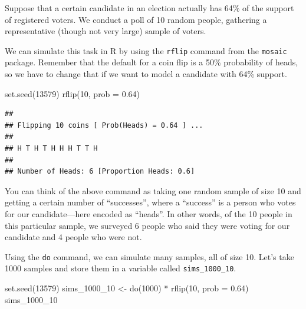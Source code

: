 \documentclass[
]{book}
\newenvironment{Shaded}{\begin{snugshade}}{\end{snugshade}}
\newcommand{\AttributeTok}[1]{\textcolor[rgb]{0.77,0.63,0.00}{#1}}
\newcommand{\DecValTok}[1]{\textcolor[rgb]{0.00,0.00,0.81}{#1}}
\newcommand{\FloatTok}[1]{\textcolor[rgb]{0.00,0.00,0.81}{#1}}
\newcommand{\FunctionTok}[1]{\textcolor[rgb]{0.00,0.00,0.00}{#1}}
\newcommand{\NormalTok}[1]{#1}
\newcommand{\OtherTok}[1]{\textcolor[rgb]{0.56,0.35,0.01}{#1}}
\newcommand{\SpecialCharTok}[1]{\textcolor[rgb]{0.00,0.00,0.00}{#1}}
\begin{document}
Suppose that a certain candidate in an election actually has 64\% of the support of registered voters. We conduct a poll of 10 random people, gathering a representative (though not very large) sample of voters.

We can simulate this task in R by using the \texttt{rflip} command from the \texttt{mosaic} package. Remember that the default for a coin flip is a 50\% probability of heads, so we have to change that if we want to model a candidate with 64\% support.

\begin{Shaded}
\begin{Highlighting}[]
\FunctionTok{set.seed}\NormalTok{(}\DecValTok{13579}\NormalTok{)}
\FunctionTok{rflip}\NormalTok{(}\DecValTok{10}\NormalTok{, }\AttributeTok{prob =} \FloatTok{0.64}\NormalTok{)}
\end{Highlighting}
\end{Shaded}

\begin{verbatim}
## 
## Flipping 10 coins [ Prob(Heads) = 0.64 ] ...
## 
## H T H T H H H T T H
## 
## Number of Heads: 6 [Proportion Heads: 0.6]
\end{verbatim}

You can think of the above command as taking one random sample of size 10 and getting a certain number of ``successes'', where a ``success'' is a person who votes for our candidate---here encoded as ``heads''. In other words, of the 10 people in this particular sample, we surveyed 6 people who said they were voting for our candidate and 4 people who were not.

Using the \texttt{do} command, we can simulate many samples, all of size 10. Let's take 1000 samples and store them in a variable called \texttt{sims\_1000\_10}.

\begin{Shaded}
\begin{Highlighting}[]
\FunctionTok{set.seed}\NormalTok{(}\DecValTok{13579}\NormalTok{)}
\NormalTok{sims\_1000\_10 }\OtherTok{\textless{}{-}} \FunctionTok{do}\NormalTok{(}\DecValTok{1000}\NormalTok{) }\SpecialCharTok{*} \FunctionTok{rflip}\NormalTok{(}\DecValTok{10}\NormalTok{, }\AttributeTok{prob =} \FloatTok{0.64}\NormalTok{)}
\NormalTok{sims\_1000\_10}
\end{Highlighting}
\end{Shaded}
\end{document}
